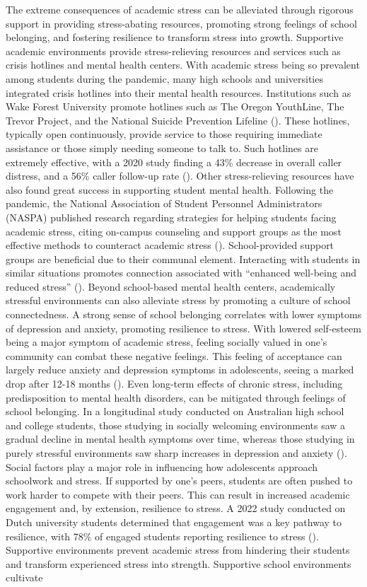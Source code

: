 The extreme consequences of academic stress can be alleviated through rigorous support in providing stress-abating resources, promoting strong feelings of school belonging, and fostering resilience to transform stress into growth. Supportive academic environments provide stress-relieving resources and services such as crisis hotlines and mental health centers. With academic stress being so prevalent among students during the pandemic, many high schools and universities integrated crisis hotlines into their mental health resources. 
Institutions such as Wake Forest University promote hotlines such as The Oregon YouthLine, The Trevor Project, and the National Suicide Prevention Lifeline (\cite{wfu2025}). These hotlines, typically open continuously, provide service to those requiring immediate assistance or those simply needing someone to talk to. Such hotlines are extremely effective, with a 2020 study finding a 43\% decrease in overall caller distress, and a 56\% caller follow-up rate (\cite{boness2021}). Other stress-relieving resources have also found great success in supporting student mental health. Following the pandemic, the National Association of Student Personnel Administrators (NASPA) published research regarding strategies for helping students facing academic stress, citing on-campus counseling and support groups as the most effective methods to counteract academic stress (\cite{wfu2025}). School-provided support groups are beneficial due to their communal element. Interacting with students in similar situations promotes connection associated with “enhanced well-being and reduced stress” (\cite{duan2016}). Beyond school-based mental health centers, academically stressful environments can also alleviate stress by promoting a culture of school connectedness. A strong sense of school belonging correlates with lower symptoms of depression and anxiety, promoting resilience to stress. With lowered self-esteem being a major symptom of academic stress, feeling socially valued in one’s community can combat these negative feelings. This feeling of acceptance can largely reduce anxiety and depression symptoms in adolescents, seeing a marked drop after 12-18 months (\cite{allen2024}). Even long-term effects of chronic stress, including predisposition to mental health disorders, can be mitigated through feelings of school belonging. In a longitudinal study conducted on Australian high school and college students, those studying in socially welcoming environments saw a gradual decline in mental health symptoms over time, whereas those studying in purely stressful environments saw sharp increases in depression and anxiety (\cite{allen2024}). Social factors play a major role in influencing how adolescents approach schoolwork and stress. If supported by one’s peers, students are often pushed to work harder to compete with their peers. This can result in increased academic engagement and, by extension, resilience to stress. A 2022 study conducted on Dutch university students determined that engagement was a key pathway to resilience, with 78\% of engaged students reporting resilience to stress (\cite{versteeg2022}). Supportive environments prevent academic stress from hindering their students and transform experienced stress into strength. Supportive school environments cultivate 